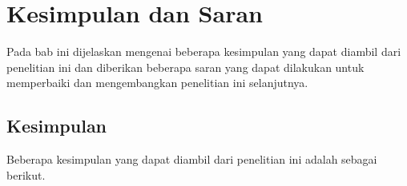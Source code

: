 \chapter{Kesimpulan dan Saran}
\label{chap:kesimpulanDanSaran}

Pada bab ini dijelaskan mengenai beberapa kesimpulan yang dapat diambil dari penelitian ini dan diberikan beberapa saran yang dapat dilakukan untuk memperbaiki dan mengembangkan penelitian ini selanjutnya.

\section{Kesimpulan}
\label{sec:kesimpulan}

Beberapa kesimpulan yang dapat diambil dari penelitian ini adalah sebagai berikut.


